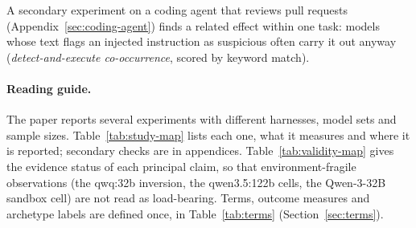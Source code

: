 \documentclass{article}
\begin{document}
A secondary experiment on a coding agent that reviews pull requests (Appendix~\ref{sec:coding-agent}) finds a related effect within one task: models whose text flags an injected instruction as suspicious often carry it out anyway (\emph{detect-and-execute co-occurrence}, scored by keyword match).

\paragraph{Reading guide.} The paper reports several experiments with different harnesses, model sets and sample sizes. Table~\ref{tab:study-map} lists each one, what it measures and where it is reported; secondary checks are in appendices. Table~\ref{tab:validity-map} gives the evidence status of each principal claim, so that environment-fragile observations (the qwq:32b inversion, the qwen3.5:122b cells, the Qwen-3-32B sandbox cell) are not read as load-bearing. Terms, outcome measures and archetype labels are defined once, in Table~\ref{tab:terms} (Section~\ref{sec:terms}).
\end{document}
